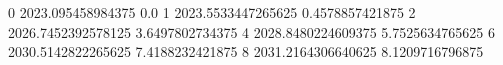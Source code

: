 0 2023.095458984375 0.0
1 2023.5533447265625 0.4578857421875
2 2026.7452392578125 3.6497802734375
4 2028.8480224609375 5.7525634765625
6 2030.5142822265625 7.4188232421875
8 2031.2164306640625 8.1209716796875
